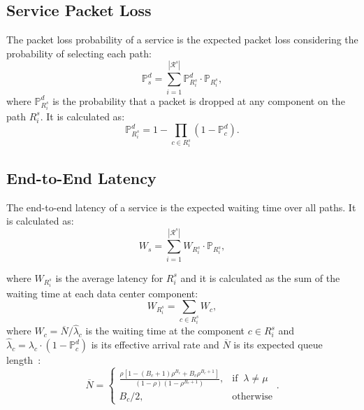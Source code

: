 

\subsection{Service Packet Loss}
\label{sec:packet_loss}

The packet loss probability of a service is the expected packet loss considering the probability of selecting each path:%
\begin{equation}
    \mathbb{P}^d_s=\sum_{i=1}^{|\mathcal{R}^s|} \mathbb{P}^d_{R^s_i}\cdot \mathbb{P}_{R^s_i},
	\label{eq:pl_service}
\end{equation}
where $\mathbb{P}^d_{R^s_i}$ is the probability that a packet is dropped at any component on the path $R^s_i$. It is calculated as:
\begin{equation}
	\mathbb{P}^d_{R^s_i}=1-\prod_{c\in R^s_i}\left(1-\mathbb{P}^d_c\right).
	\label{eq:pl_path}
\end{equation}

\subsection{End-to-End Latency}
The end-to-end latency of a service is the expected waiting time over all paths. It is calculated as:
\begin{equation}
	W_s=\sum_{i=1}^{|\mathcal{R}^s|} W_{R^s_i} \cdot\mathbb{P}_{R^s_i},
\end{equation}

\noindent where $W_{R^s_i}$ is the average latency for $R^s_i$ and it is calculated as the sum of the waiting time at each data center component:
\begin{equation}
	W_{R^s_i} = \sum_{c\in R^s_i} W_c,
\end{equation}
where $W_c=\overline{N}/\hat{\lambda}_c$ is the waiting time at the component $c\in R^s_i$ and $\hat{\lambda}_c=\lambda_c\cdot\left(1-\mathbb{P}^d_c \right)$ is its effective arrival rate and $\overline{N}$ is its expected queue length~\cite{Kleinrock75}:
\begin{equation}
	\overline{N} = \begin{cases}
		\frac{\rho[1 - (B_c + 1)\rho^{B_c} + B_c\rho^{B_c+1}]}{(1 - \rho)(1 - \rho^{B_c+1})} , & \text{if } \ \lambda \neq \mu \\
		B_c/2,                                                                      & \text{otherwise}
	\end{cases}.
\end{equation}

